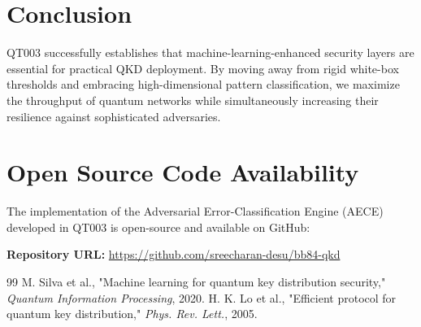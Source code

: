 \documentclass[journal,onecolumn,12pt,draftclsnofoot]{IEEEtran}
\begin{document}
\newpage

\section{Conclusion}

QT003 successfully establishes that machine-learning-enhanced security layers are essential for practical QKD deployment. By moving away from rigid white-box thresholds and embracing high-dimensional pattern classification, we maximize the throughput of quantum networks while simultaneously increasing their resilience against sophisticated adversaries.

\section*{Open Source Code Availability}
The implementation of the Adversarial Error-Classification Engine (AECE) developed in QT003 is open-source and available on GitHub:
\begin{center}
    \textbf{Repository URL:} \href{https://github.com/sreecharan-desu/bb84-qkd}{https://github.com/sreecharan-desu/bb84-qkd}
\end{center}

\begin{thebibliography}{99}
 M. Silva et al., "Machine learning for quantum key distribution security," \emph{Quantum Information Processing}, 2020.
 H. K. Lo et al., "Efficient protocol for quantum key distribution," \emph{Phys. Rev. Lett.}, 2005.
\end{thebibliography}
\end{document}
